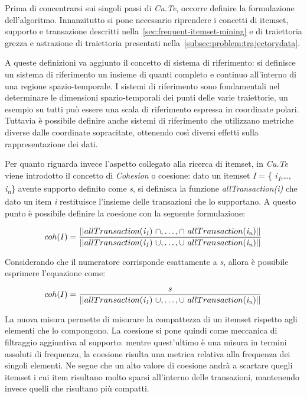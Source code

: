 Prima di concentrarsi sui singoli passi di \textit{Cu.Te}, occorre definire la formulazione dell'algoritmo.
Innanzitutto si pone necessario riprendere i concetti di itemset, supporto e transazione descritti nella~\cref{sec:frequent-itemset-mining}
e di traiettoria grezza e astrazione di traiettoria presentati nella~\cref{subsec:problem:trajectorydata}.

A queste definizioni va aggiunto il concetto di sistema di riferimento: si definisce un sistema di riferimento un insieme di
quanti completo e continuo all'interno di una regione spazio-temporale.
I sistemi di riferimento sono fondamentali nel determinare le dimensioni spazio-temporali dei punti delle varie traiettorie,
un esempio su tutti può essere una scala di riferimento espressa in coordinate polari.
Tuttavia è possibile definire anche sistemi di riferimento che utilizzano metriche diverse dalle coordinate sopracitate,
ottenendo così diversi effetti sulla rappresentazione dei dati.

Per quanto riguarda invece l'aspetto collegato alla ricerca di itemset,
in \textit{Cu.Te} viene introdotto il concetto di \textit{Cohesion} o coesione: dato un itemset \textit{I} = \{ \textit{i\textsubscript{1}},\ldots, \textit{i\textsubscript{n}}\}
avente supporto definito come \textit{s}, si definisca la funzione \textit{allTransaction(i)} %
 che dato un item \textit{i} restituisce l'insieme delle
transazioni che lo supportano. A questo punto è possibile definire la coesione con la seguente formulazione:

\[ coh(I) = \frac{\lvert \lvert allTransaction(\textit{i\textsubscript{1}})~\cap ,\ldots, \cap~allTransaction(\textit{i\textsubscript{n}}) \rvert\rvert}{\lvert \lvert allTransaction(\textit{i\textsubscript{1}})~\cup ,\ldots, \cup~allTransaction(\textit{i\textsubscript{n}}) \rvert\rvert} \]

Considerando che il numeratore corrisponde esattamente a \textit{s}, allora è possibile esprimere l'equazione come:

\[ coh(I) = \frac{s}{\lvert \lvert allTransaction(\textit{i\textsubscript{1}})~\cup ,\ldots, \cup~allTransaction(\textit{i\textsubscript{n}}) \rvert\rvert} \]

La nuova misura permette di misurare la compattezza di un itemset rispetto agli elementi che lo compongono.
La coesione si pone quindi come meccanica di filtraggio aggiuntiva al supporto:
mentre quest'ultimo è una misura in termini assoluti di frequenza, la coesione risulta una metrica relativa alla frequenza dei singoli elementi.
Ne segue che un alto valore di coesione andrà a scartare quegli itemset i cui item risultano molto sparsi all'interno delle transazioni,
mantenendo invece quelli che risultano più compatti.

